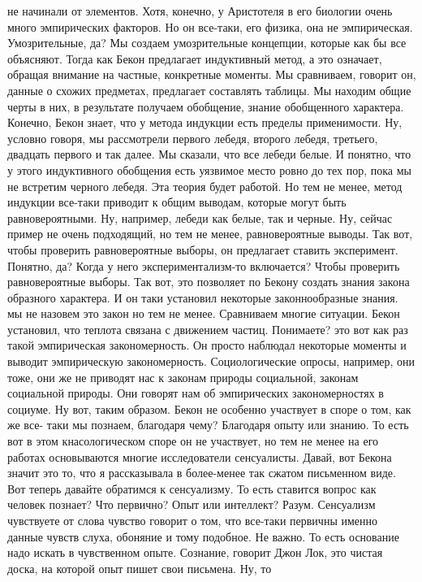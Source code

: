 не начинали от элементов. Хотя, конечно, у Аристотеля в его биологии очень много
эмпирических факторов. Но он все-таки, его физика, она не эмпирическая.
Умозрительные, да? Мы создаем умозрительные концепции, которые как бы все
объясняют. Тогда как Бекон предлагает индуктивный метод, а это означает, обращая
внимание на частные, конкретные моменты. Мы сравниваем, говорит он, данные о
схожих предметах, предлагает составлять таблицы. Мы находим общие черты в них, в
результате получаем обобщение, знание обобщенного характера. Конечно, Бекон
знает, что у метода индукции есть пределы применимости. Ну, условно говоря, мы
рассмотрели первого лебедя, второго лебедя, третьего, двадцать первого и так
далее. Мы сказали, что все лебеди белые. И понятно, что у этого индуктивного
обобщения есть уязвимое место ровно до тех пор, пока мы не встретим черного
лебедя. Эта теория будет работой. Но тем не менее, метод индукции все-таки
приводит к общим выводам, которые могут быть равновероятными. Ну, например,
лебеди как белые, так и черные. Ну, сейчас пример не очень подходящий, но тем не
менее, равновероятные выводы. Так вот, чтобы проверить равновероятные выборы, он
предлагает ставить эксперимент. Понятно, да? Когда у него экспериментализм-то
включается? Чтобы проверить равновероятные выборы. Так вот, это позволяет по
Бекону создать знания закона образного характера. И он таки установил некоторые
законнообразные знания. мы не назовем это закон но тем не менее. Сравниваем
многие ситуации. Бекон установил, что теплота связана с движением частиц.
Понимаете? это вот как раз такой эмпирическая закономерность. Он просто наблюдал
некоторые моменты и выводит эмпирическую закономерность. Социологические опросы,
например, они тоже, они же не приводят нас к законам природы социальной, законам
социальной природы. Они говорят нам об эмпирических закономерностях в социуме.
Ну вот, таким образом. Бекон не особенно участвует в споре о том, как же все-
таки мы познаем, благодаря чему? Благодаря опыту или знанию. То есть вот в этом
кнасологическом споре он не участвует, но тем не менее на его работах
основываются многие исследователи сенсуалисты. Давай, вот Бекона значит это то,
что я рассказывала в более-менее так сжатом письменном виде. Вот теперь давайте
обратимся к сенсуализму. То есть ставится вопрос как человек познает? Что
первично? Опыт или интеллект? Разум. Сенсуализм чувствуете от слова чувство
говорит о том, что все-таки первичны именно данные чувств слуха, обоняние и тому
подобное. Не важно. То есть основание надо искать в чувственном опыте. Сознание,
говорит Джон Лок, это чистая доска, на которой опыт пишет свои письмена. Ну, то
